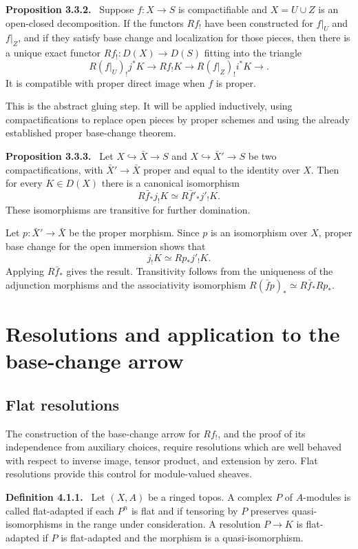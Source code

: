 \documentclass[12pt]{article}
\newenvironment{statement}[1]{\par\medskip\noindent\textbf{#1.}\ }{\par\medskip}
\begin{document}
\begin{statement}{Proposition 3.3.2}
Suppose \(f:X\to S\) is compactifiable and \(X=U\cup Z\) is an open-closed decomposition. If the functors \(Rf_!\) have been constructed for \(f|_U\) and \(f|_Z\), and if they satisfy base change and localization for those pieces, then there is a unique exact functor \(Rf_!:D(X)\to D(S)\) fitting into the triangle
\[
R(f|_U)_!j^*K\to Rf_!K\to R(f|_Z)_!i^*K\to.
\]
It is compatible with proper direct image when \(f\) is proper.
\end{statement}

This is the abstract gluing step. It will be applied inductively, using compactifications to replace open pieces by proper schemes and using the already established proper base-change theorem.

\begin{statement}{Proposition 3.3.3}
Let \(X\hookrightarrow\bar X\to S\) and \(X\hookrightarrow\bar X'\to S\) be two compactifications, with \(\bar X'\to\bar X\) proper and equal to the identity over \(X\). Then for every \(K\in D(X)\) there is a canonical isomorphism
\[
R\bar f_*j_!K\simeq R\bar f'_*j'_!K.
\]
These isomorphisms are transitive for further domination.
\end{statement}

Let \(p:\bar X'\to\bar X\) be the proper morphism. Since \(p\) is an isomorphism over \(X\), proper base change for the open immersion shows that
\[
j_!K\simeq Rp_*j'_!K.
\]
Applying \(R\bar f_*\) gives the result. Transitivity follows from the uniqueness of the adjunction morphisms and the associativity isomorphism \(R(\bar f p)_*\simeq R\bar f_*Rp_*\).

\section{Resolutions and application to the base-change arrow}

\subsection{Flat resolutions}

The construction of the base-change arrow for \(Rf_!\), and the proof of its independence from auxiliary choices, require resolutions which are well behaved with respect to inverse image, tensor product, and extension by zero. Flat resolutions provide this control for module-valued sheaves.

\begin{statement}{Definition 4.1.1}
Let \((X,A)\) be a ringed topos. A complex \(P\) of \(A\)-modules is called flat-adapted if each \(P^n\) is flat and if tensoring by \(P\) preserves quasi-isomorphisms in the range under consideration. A resolution \(P\to K\) is flat-adapted if \(P\) is flat-adapted and the morphism is a quasi-isomorphism.
\end{statement}
\end{document}

